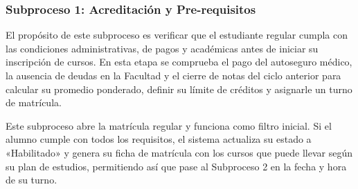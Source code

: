 \subsubsection{Subproceso 1: Acreditación y Pre-requisitos}

El propósito de este subproceso es verificar que el estudiante regular cumpla con las condiciones administrativas, de pagos y académicas antes de iniciar su inscripción de cursos. En esta etapa se comprueba el pago del autoseguro médico, la ausencia de deudas en la Facultad y el cierre de notas del ciclo anterior para calcular su promedio ponderado, definir su límite de créditos y asignarle un turno de matrícula.

Este subproceso abre la matrícula regular y funciona como filtro inicial. Si el alumno cumple con todos los requisitos, el sistema actualiza su estado a «Habilitado» y genera su ficha de matrícula con los cursos que puede llevar según su plan de estudios, permitiendo así que pase al Subproceso 2 en la fecha y hora de su turno.

